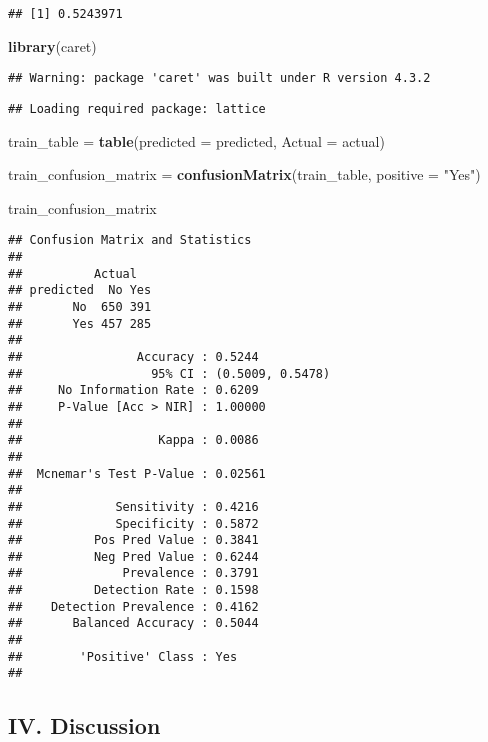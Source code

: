 \documentclass[
]{article}
\newenvironment{Shaded}{\begin{snugshade}}{\end{snugshade}}
\newcommand{\AttributeTok}[1]{\textcolor[rgb]{0.13,0.29,0.53}{#1}}
\newcommand{\FunctionTok}[1]{\textcolor[rgb]{0.13,0.29,0.53}{\textbf{#1}}}
\newcommand{\NormalTok}[1]{#1}
\newcommand{\OtherTok}[1]{\textcolor[rgb]{0.56,0.35,0.01}{#1}}
\newcommand{\StringTok}[1]{\textcolor[rgb]{0.31,0.60,0.02}{#1}}
\begin{document}
\begin{verbatim}
## [1] 0.5243971
\end{verbatim}

\begin{Shaded}
\begin{Highlighting}[]
\FunctionTok{library}\NormalTok{(caret)}
\end{Highlighting}
\end{Shaded}

\begin{verbatim}
## Warning: package 'caret' was built under R version 4.3.2
\end{verbatim}

\begin{verbatim}
## Loading required package: lattice
\end{verbatim}

\begin{Shaded}
\begin{Highlighting}[]
\NormalTok{train\_table }\OtherTok{=} \FunctionTok{table}\NormalTok{(}\AttributeTok{predicted =}\NormalTok{ predicted, }\AttributeTok{Actual =}\NormalTok{ actual)}

\NormalTok{train\_confusion\_matrix }\OtherTok{=} \FunctionTok{confusionMatrix}\NormalTok{(train\_table, }\AttributeTok{positive =} \StringTok{"Yes"}\NormalTok{)}

\NormalTok{train\_confusion\_matrix}
\end{Highlighting}
\end{Shaded}

\begin{verbatim}
## Confusion Matrix and Statistics
## 
##          Actual
## predicted  No Yes
##       No  650 391
##       Yes 457 285
##                                           
##                Accuracy : 0.5244          
##                  95% CI : (0.5009, 0.5478)
##     No Information Rate : 0.6209          
##     P-Value [Acc > NIR] : 1.00000         
##                                           
##                   Kappa : 0.0086          
##                                           
##  Mcnemar's Test P-Value : 0.02561         
##                                           
##             Sensitivity : 0.4216          
##             Specificity : 0.5872          
##          Pos Pred Value : 0.3841          
##          Neg Pred Value : 0.6244          
##              Prevalence : 0.3791          
##          Detection Rate : 0.1598          
##    Detection Prevalence : 0.4162          
##       Balanced Accuracy : 0.5044          
##                                           
##        'Positive' Class : Yes             
## 
\end{verbatim}

\subsection{IV. Discussion}\label{iv.-discussion}
\end{document}
